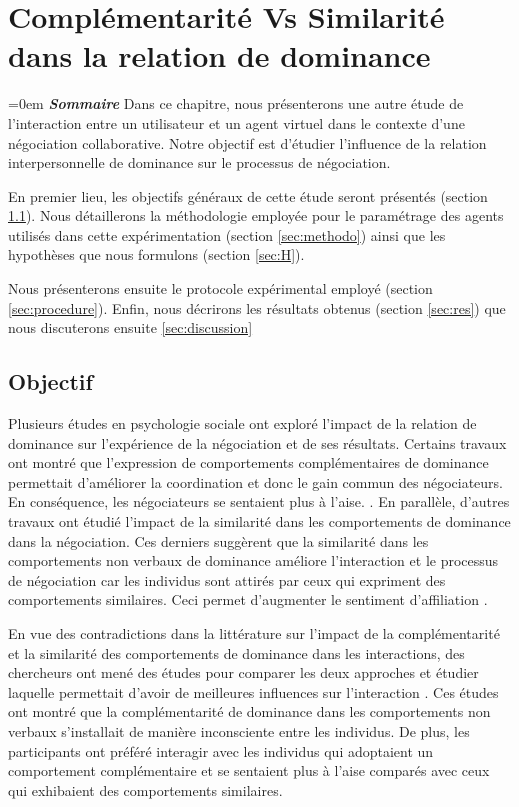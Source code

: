 \chapter[Complémentarité Vs Similarité]{Complémentarité Vs Similarité dans la relation de dominance}
\label{chap:chap6}
	\begingroup
	\parindent=0em
	\emph{\textbf{Sommaire}} \vspace{0.5em}
	\localtableofcontents 
	\clearpage
	\endgroup
Dans ce chapitre, nous présenterons une autre étude de l'interaction entre un utilisateur et un agent virtuel dans le contexte d'une négociation collaborative. 
Notre objectif est d'étudier l'influence de la relation interpersonnelle de dominance sur le processus de négociation. 

En premier lieu, les objectifs généraux de cette étude seront présentés (section \ref{sec:obj}). Nous détaillerons la méthodologie employée pour le paramétrage des agents utilisés dans cette expérimentation (section \ref{sec:methodo}) ainsi que les hypothèses que nous formulons (section \ref{sec:H}).

Nous présenterons ensuite le protocole expérimental employé (section \ref{sec:procedure}). Enfin, nous décrirons les résultats obtenus  (section \ref{sec:res})
que nous discuterons ensuite \ref{sec:discussion}
\section{Objectif}
\label{sec:obj}

Plusieurs études en psychologie sociale ont exploré l'impact de la relation de dominance sur l'expérience de la négociation et de ses résultats. Certains travaux ont montré que l'expression de comportements complémentaires de dominance permettait d'améliorer la coordination et donc le gain commun des négociateurs. En conséquence, les négociateurs se sentaient plus à l'aise. \cite{tiedens2003power,wiltermuth2009benefits,olekalns2013dyadic}.
En parallèle, d'autres travaux ont étudié l'impact de la similarité dans les comportements de dominance dans la négociation. Ces derniers suggèrent que la similarité dans les comportements non verbaux de dominance améliore l'interaction et le processus de négociation car les individus sont attirés par ceux qui expriment des comportements similaires. Ceci permet d'augmenter le sentiment d'affiliation \cite{olekalns2013dyadic}. 

En vue des contradictions dans la littérature sur l'impact de la complémentarité et la similarité des comportements de dominance dans les interactions, des chercheurs ont mené des études pour comparer les deux approches et étudier laquelle permettait d'avoir de meilleures influences sur l'interaction \cite{tiedens2003power,dryer1997opposites}. Ces études ont montré que la complémentarité de dominance dans les comportements non verbaux s'installait de manière inconsciente entre les individus. De plus, les participants ont préféré interagir avec les individus qui adoptaient un comportement complémentaire et se sentaient plus à l'aise comparés avec ceux qui exhibaient des comportements similaires. 



